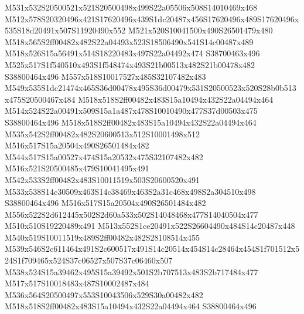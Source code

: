 \documentclass{article}
\begin{document}
\begin{multicols}{2}



M531x532S20500521x521S20500498x499S22a05506x508S14010469x468 M512x578S20320496x421S17620496x439S1dc20487x456S17620496x489S17620496x535S18d20491x507S11920490x552 M521x520S10041500x490S26501479x480 M518x565S2ff00482x482S22a04493x523S18506490x541S14c00487x489 M518x526S15a56491x514S18220483x497S22a04492x474 S38700463x496 M525x517S1f540510x493S1f548474x493S21b00513x482S21b00478x482 S38800464x496 M557x518S10017527x485S32107482x483 M549x535S1dc21474x465S36d00478x495S36d00479x531S20500523x520S28b0b513x475S20500467x484 M518x518S2ff00482x483S15a10494x432S22a04494x464 M514x524S22a00491x509S15a1a487x478S10010490x477S37d00503x475 S38800464x496 M518x518S2ff00482x483S15a10494x432S22a04494x464 M535x542S2ff00482x482S20600513x512S10001498x512 M516x517S15a20504x490S26501484x482 M544x517S15a00527x474S15a20532x475S32107482x482 M516x521S20500485x479S10041495x491 M542x533S2ff00482x483S10011519x503S20600520x491 M533x538S14c30509x463S14c38469x463S2a31c468x498S2a304510x498 S38800464x496 M516x517S15a20504x490S26501484x482 M556x522S2d612445x502S2d60a533x502S14048468x477S14040504x477 M510x510S19220489x491 M513x552S1ce20491x522S26604490x484S14c20487x448 M540x519S10011519x489S2ff00482x482S28108514x455 M539x546S2c611464x491S2c600517x491S14c20514x454S14c28464x454S1f701512x524S1f709465x524S37c06527x507S37c06460x507 M538x524S15a39462x495S15a39492x501S2b707513x483S2b717484x477 M517x517S10018483x487S10002487x484 M536x564S20500497x553S10043506x529S30a00482x482 M518x518S2ff00482x483S15a10494x432S22a04494x464 S38800464x496




\end{multicols}
\end{document}
